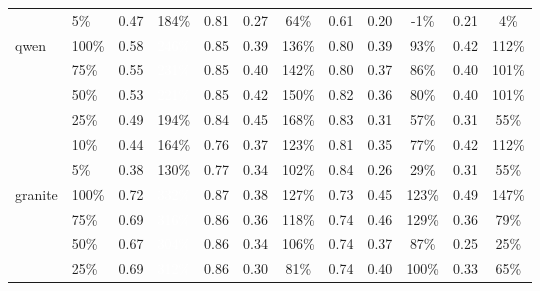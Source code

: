 \begin{longtable}{llcccccccccc}
 & 5\% & 0.47 & \cellcolor{tablegreen!53}184\% & 0.81 & 0.27 & \cellcolor{tablegreen!18}64\% & 0.61 & 0.20 & \cellcolor[HTML]{E8A0A0}-1\% & 0.21 & \cellcolor{tablegreen!1}4\% \\
\cmidrule(l){1-12}
\multirow{6}{*}{qwen} & 100\% & 0.58 & \cellcolor{tablegreen!70}\textcolor{white}{246\%} & 0.85 & 0.39 & \cellcolor{tablegreen!39}136\% & 0.80 & 0.39 & \cellcolor{tablegreen!27}93\% & 0.42 & \cellcolor{tablegreen!32}112\% \\
 & 75\% & 0.55 & \cellcolor{tablegreen!66}\textcolor{white}{231\%} & 0.85 & 0.40 & \cellcolor{tablegreen!41}142\% & 0.80 & 0.37 & \cellcolor{tablegreen!25}86\% & 0.40 & \cellcolor{tablegreen!29}101\% \\
 & 50\% & 0.53 & \cellcolor{tablegreen!63}\textcolor{white}{221\%} & 0.85 & 0.42 & \cellcolor{tablegreen!43}150\% & 0.82 & 0.36 & \cellcolor{tablegreen!23}80\% & 0.40 & \cellcolor{tablegreen!29}101\% \\
 & 25\% & 0.49 & \cellcolor{tablegreen!56}194\% & 0.84 & 0.45 & \cellcolor{tablegreen!48}168\% & 0.83 & 0.31 & \cellcolor{tablegreen!16}57\% & 0.31 & \cellcolor{tablegreen!16}55\% \\
 & 10\% & 0.44 & \cellcolor{tablegreen!47}164\% & 0.76 & 0.37 & \cellcolor{tablegreen!35}123\% & 0.81 & 0.35 & \cellcolor{tablegreen!22}77\% & 0.42 & \cellcolor{tablegreen!32}112\% \\
 & 5\% & 0.38 & \cellcolor{tablegreen!37}130\% & 0.77 & 0.34 & \cellcolor{tablegreen!29}102\% & 0.84 & 0.26 & \cellcolor{tablegreen!8}29\% & 0.31 & \cellcolor{tablegreen!16}55\% \\
\cmidrule(l){1-12}
\multirow{6}{*}{granite} & 100\% & 0.72 & \cellcolor{tablegreen!95}\textcolor{white}{332\%} & 0.87 & 0.38 & \cellcolor{tablegreen!36}127\% & 0.73 & 0.45 & \cellcolor{tablegreen!35}123\% & 0.49 & \cellcolor{tablegreen!42}147\% \\
 & 75\% & 0.69 & \cellcolor{tablegreen!90}\textcolor{white}{316\%} & 0.86 & 0.36 & \cellcolor{tablegreen!34}118\% & 0.74 & 0.46 & \cellcolor{tablegreen!37}129\% & 0.36 & \cellcolor{tablegreen!23}79\% \\
 & 50\% & 0.67 & \cellcolor{tablegreen!87}\textcolor{white}{304\%} & 0.86 & 0.34 & \cellcolor{tablegreen!30}106\% & 0.74 & 0.37 & \cellcolor{tablegreen!25}87\% & 0.25 & \cellcolor{tablegreen!7}25\% \\
 & 25\% & 0.69 & \cellcolor{tablegreen!89}\textcolor{white}{312\%} & 0.86 & 0.30 & \cellcolor{tablegreen!23}81\% & 0.74 & 0.40 & \cellcolor{tablegreen!29}100\% & 0.33 & \cellcolor{tablegreen!19}65\% \\

\end{longtable}
